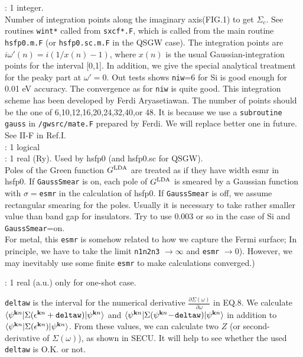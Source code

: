 {\begin{enumerate}
 : 1 integer. \\
Number of integration points along the imaginary axis(FIG.1)
to get $\Sigma_c$.
See routines {\tt wint*} called from {\tt sxcf*.F},
which is called from the main routine {\tt hsfp0.m.F} (or {\tt hsfp0.sc.m.F} in the QSGW case).
The integration points are
$i \omega'(n)= i( 1/x(n) -1)$, where $x(n)$ is
the usual Gaussian-integration points for the interval [0,1].
In addition, we give the special analytical treatment for
the peaky part at $\omega'=0$.
Out tests shows {\tt niw}=6 for Si is good enough for 0.01 eV accuracy.
The convergence as for {\tt niw} is quite good.
This integration scheme has been developed by Ferdi Aryasetiawan.
The number of points should be the one of 6,10,12,16,20,24,32,40,or 48. 
It is because we use a {\tt subroutine gauss} in {\tt /gwsrc/mate.F} 
prepared by Ferdi. We will replace better one in future.
See II-F in Ref.I.\\

 : 1 logical \\
 : 1 real (Ry). Used by hsfp0 (and hsfp0.sc for QSGW). \\
Poles of  the Green function $G^{\rm LDA}$ are treated as 
if they have width esmr in hsfp0.
If {\tt GaussSmear} is on, each pole of $G^{\rm LDA}$
is smeared by a Gaussian function with $\sigma=${\tt esmr} in the
 calculation of hsfp0. 
If {\tt GaussSmear} is off, we assume rectangular smearing for the poles.
Usually it is necessary to take rather smaller value than band gap 
for insulators. Try to use 0.003 or so in the case of Si and {\tt GaussSmear}=on.\\
For metal, this {\tt esmr} is somehow related to how we capture the
Fermi surface; In principle, we have to take the limit 
{\tt n1n2n3} $\to \infty$ and
{\tt esmr} $\to 0$). However, we may inevitably use some finite 
{\tt esmr} to make calculations converged.)


: 1 real (a.u.) only for one-shot case.

{\tt deltaw} is the interval for the numerical derivative
$\frac{\partial \Sigma(\omega)}{\partial \omega}$ in EQ.8.
We calculate $\langle \psi^{{\bf k}n} |\Sigma(\epsilon^{{\bf k}n}+{\tt deltaw}) |\psi^{{\bf k}n} \rangle$ 
and $\langle \psi^{{\bf k}n} |\Sigma(\psi^{{\bf k}n}\!-\!{\tt deltaw})|\psi^{{\bf k}n} \rangle$
in addition to $\langle \psi^{{\bf k}n} |\Sigma(\epsilon^{{\bf k}n})|\psi^{{\bf k}n} \rangle$.
From these values, we can calculate two $Z$ (or second-derivative of $\Sigma(\omega)$), as shown
in {\sf SECU}. It will help to see whether the used \verb#deltaw# is O.K. or not.


\end{enumerate}}
